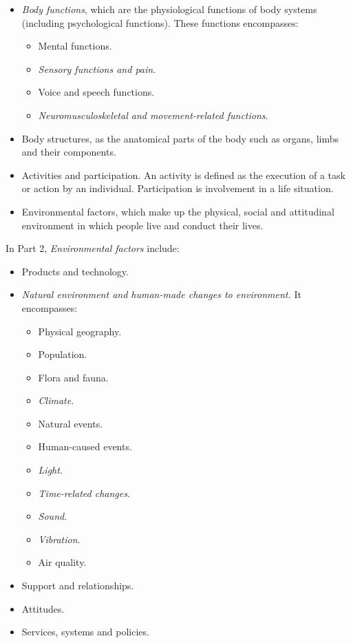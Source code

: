 \begin{itemize}
  \item \textit{Body functions}, which are the physiological functions of body 
  systems (including psychological functions). These functions encompasses:
    \begin{itemize}
      \item Mental functions.
      \item \textit{Sensory functions and pain}.
      \item Voice and speech functions.
      \item \textit{Neuromusculoskeletal and movement-related functions}.
    \end{itemize}
  \item Body structures, as the anatomical parts of the body such as organs, 
  limbs and their components.
  \item Activities and participation. An activity is defined as the execution of 
  a task or action by an individual. Participation is involvement in a life 
  situation.
  \item Environmental factors, which make up the physical, social and attitudinal
  environment in which people live and conduct their lives.
\end{itemize}

In Part 2, \textit{Environmental factors} include:

\begin{itemize}
  \item Products and technology.
  \item \textit{Natural environment and human-made changes to environment.} It 
  encompasses:
  \begin{itemize}
    \item Physical geography.
    \item Population.
    \item Flora and fauna.
    \item \textit{Climate}.
    \item Natural events.
    \item Human-caused events.
    \item \textit{Light}.
    \item \textit{Time-related changes}.
    \item \textit{Sound}.
    \item \textit{Vibration}.
    \item Air quality.
  \end{itemize}

  \item Support and relationships.
  \item Attitudes.
  \item Services, systems and policies.
\end{itemize}

